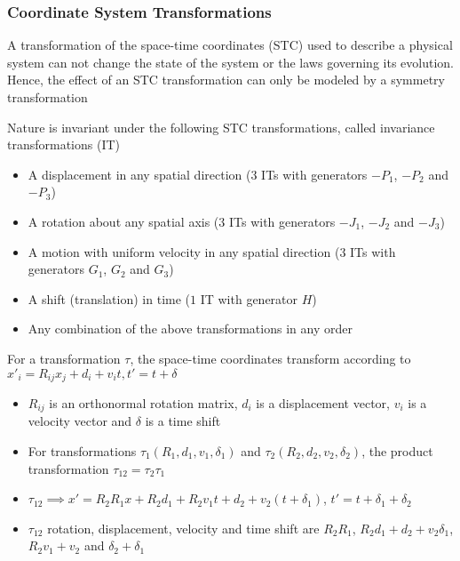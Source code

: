 \documentclass[8pt,t,mathserif,aspectratio=169]{beamer}
\begin{document}
\begin{frame}
  \frametitle{Coordinate System Transformations}
  \vspace{1mm}
  A transformation of the space-time coordinates (STC) used to describe a physical system can not change the state of the system or the laws governing its evolution. Hence, the effect of an STC transformation can only be modeled by a symmetry transformation

  Nature is invariant under the following STC transformations, called invariance transformations (IT)
  \begin{itemize}
    \item A displacement in any spatial direction ($3$ ITs with generators $-P_1$, $-P_2$ and $-P_3$)
    \item A rotation about any spatial axis ($3$ ITs with generators $-J_1$, $-J_2$ and $-J_3$)
    \item A motion with uniform velocity in any spatial direction ($3$ ITs with generators $G_1$, $G_2$ and $G_3$)
    \item A shift (translation) in time ($1$ IT with generator $H$)
    \item Any combination of the above transformations in any order
  \end{itemize}
  For a transformation $\tau$, the space-time coordinates transform according to $x'_i = R_{ij} x_j + d_i + v_i t, t' = t + \delta$ 
  \begin{itemize}
    \item $R_{ij}$ is an orthonormal rotation matrix, $d_i$ is a displacement vector, $v_i$ is a velocity vector and $\delta$ is a time shift
    \item For transformations $\tau_1(R_1,d_1,v_1,\delta_1)$ and $\tau_2(R_2,d_2,v_2,\delta_2)$, the product transformation $\tau_{12} = \tau_2 \tau_1$
    \item $\tau_{12} \implies x' = R_2 R_1 x + R_2 d_1 + R_2 v_1 t + d_2 + v_2 (t + \delta_1)$, $t' = t + \delta_1 + \delta_2$
    \item $\tau_{12}$ rotation, displacement, velocity and time shift are $R_2 R_1$, $R_2 d_1 + d_2 + v_2 \delta_1$, $R_2 v_1 + v_2$ and $\delta_2 + \delta_1$
  \end{itemize}

\end{frame}
\end{document}
